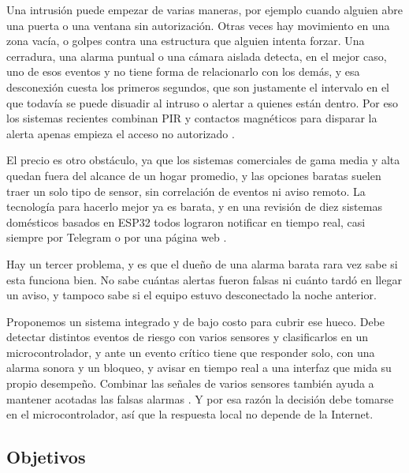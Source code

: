 \documentclass[manuscript,screen,nonacm]{acmart}
\begin{document}
Una intrusión puede empezar de varias maneras, por ejemplo cuando alguien abre una puerta o una ventana sin autorización. Otras veces hay movimiento en una zona vacía, o golpes contra una estructura que alguien intenta forzar. Una cerradura, una alarma puntual o una cámara aislada detecta, en el mejor caso, uno de esos eventos y no tiene forma de relacionarlo con los demás, y esa desconexión cuesta los primeros segundos, que son justamente el intervalo en el que todavía se puede disuadir al intruso o alertar a quienes están dentro. Por eso los sistemas recientes combinan PIR y contactos magnéticos para disparar la alerta apenas empieza el acceso no autorizado \cite{arinde2024multisensor}.

El precio es otro obstáculo, ya que los sistemas comerciales de gama media y alta quedan fuera del alcance de un hogar promedio, y las opciones baratas suelen traer un solo tipo de sensor, sin correlación de eventos ni aviso remoto. La tecnología para hacerlo mejor ya es barata, y en una revisión de diez sistemas domésticos basados en ESP32 todos lograron notificar en tiempo real, casi siempre por Telegram o por una página web \cite{oktafiani2025esp32}.

Hay un tercer problema, y es que el dueño de una alarma barata rara vez sabe si esta funciona bien. No sabe cuántas alertas fueron falsas ni cuánto tardó en llegar un aviso, y tampoco sabe si el equipo estuvo desconectado la noche anterior.

Proponemos un sistema integrado y de bajo costo para cubrir ese hueco. Debe detectar distintos eventos de riesgo con varios sensores y clasificarlos en un microcontrolador, y ante un evento crítico tiene que responder solo, con una alarma sonora y un bloqueo, y avisar en tiempo real a una interfaz que mida su propio desempeño. Combinar las señales de varios sensores también ayuda a mantener acotadas las falsas alarmas \cite{pugh2015fusion}. Y por esa razón la decisión debe tomarse en el microcontrolador, así que la respuesta local no depende de la Internet.

\subsection{Objetivos}
\end{document}
